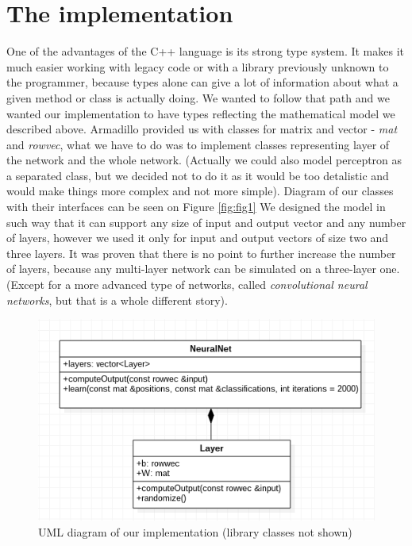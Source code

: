 \documentclass[3p,twocolumn]{elsarticle}
\begin{document}
\section{The implementation}

One of the advantages of the C++ language is its strong type system. It makes it much easier working with legacy code or with a library previously unknown to the programmer, because types alone can give a lot of information about what a given method or class is actually doing. We wanted to follow that path and we wanted our implementation to have types reflecting the mathematical model we described above. Armadillo provided us with classes for matrix and vector - \emph{mat} and \emph{rowvec}, what we have to do was to implement classes representing layer of the network and the whole network. (Actually we could also model perceptron as a separated class, but we decided not to do it as it would be too detalistic and would make things more complex and not more simple). Diagram of our classes with their interfaces can be seen on Figure \ref{fig:fig1} We designed the model in such way that it can support any size of input and output vector and any number of layers, however we used it only for input and output vectors of size two and three layers. It was proven that there is no point to further increase the number of layers, because any multi-layer network can be simulated on a three-layer one. (Except for a more advanced type of networks, called \emph{convolutional neural networks}, but that is a whole different story).

\begin{figure}[h]
	
\label{fig:fig3}
  \includegraphics[width=\linewidth]{uml-diagram.png}
	\caption{UML diagram of our implementation (library classes not shown)}
	\label{fig3}
\end{figure}
\end{document}
